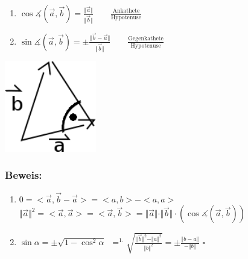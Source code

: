 \begin{minipage}{0.5\textwidth}
	\begin{enumerate}
	\item $\cos \measuredangle(\vec{a},\vec{b})=\frac{\Vert\vec{a}\Vert}
		{\Vert\vec{b}\Vert} \qquad \frac{\textrm{Ankathete}}{\textrm{Hypotenuse}}$
	\item $\sin\measuredangle(\vec{a},\vec{b})=\pm\frac{\Vert\vec{b}-\vec{a}\Vert}
		{\Vert\vec{b}\Vert} \qquad \frac{\textrm{Gegenkathete}}
		{\textrm{Hypotenuse}}$
	\end{enumerate}
\end{minipage}
\begin{minipage}{0.5\textwidth}
	\includegraphics[width=0.3\textwidth]{mainmatter/chapter1/pics/trigo3.png}
\end{minipage}
%
\subsubsection{Beweis:}
\begin{enumerate}
	\item $0=<\vec{a},\vec{b}-\vec{a}>=<a,b>-<a,a>$\\
		$\Vert\vec{a}\Vert^{2}=<\vec{a},\vec{a}>=<\vec{a},\vec{b}>=
		\Vert\vec{a}\Vert\cdot\Vert\vec{b}\Vert\cdot(\cos\measuredangle(\vec{a},
		\vec{b}))$
	\item $\sin\alpha=\pm\sqrt{1-\cos^{2}\alpha}$\
		$\mathop{=}^{\text{1.}}\sqrt{\frac{\Vert\vec{b}\Vert^{2}-\Vert a \Vert^{2}}
		{\Vert b \Vert^{2}}} =\pm \frac{\Vert b-a\Vert}{-\Vert b \Vert}$ \qquad 	
		$\square$
\end{enumerate}
